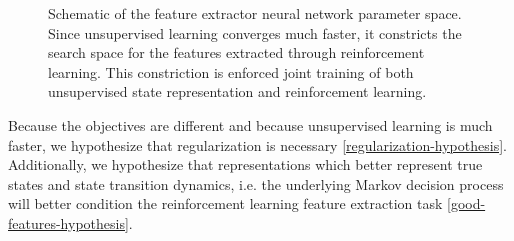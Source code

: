 \begin{figure}[htpb]
\begin{center}

\def\setA{(1.0,0) circle (2)}%
\def\setB{(2.7,0) circle (1.5)}%
\def\boundb{(-5,3) rectangle (9,-3)}%
\end{center}
\caption{Schematic of the feature extractor neural network parameter space. Since unsupervised learning
		converges much faster, it constricts the search space for the features extracted through reinforcement learning.
		This constriction is enforced joint training
of both unsupervised state representation and reinforcement learning.}
\label{fig-rl-srl-features-space}
\end{figure}

Because the objectives are different and because unsupervised learning is much faster,
we hypothesize that regularization is necessary \ref{regularization-hypothesis}.
Additionally, we hypothesize that representations which better represent true states
and state transition dynamics, i.e. the underlying Markov decision process
will better condition the reinforcement learning feature extraction task \ref{good-features-hypothesis}.

